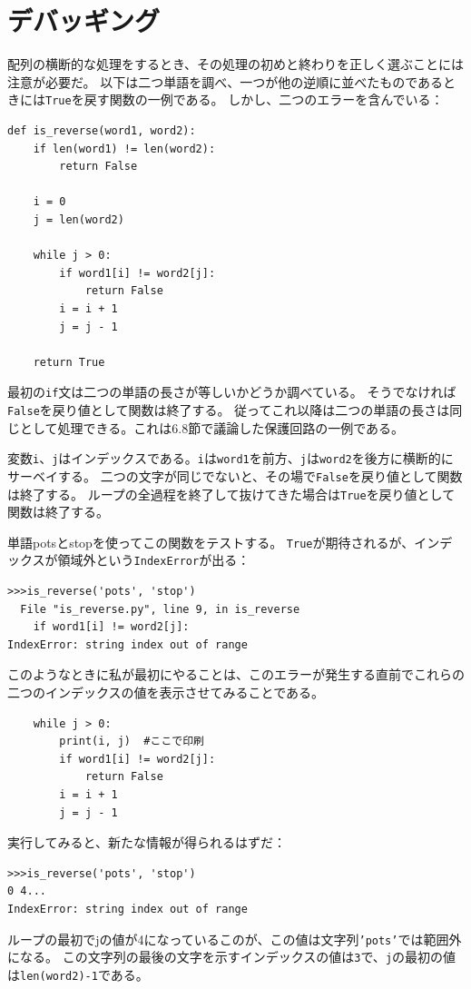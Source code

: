 \documentclass[a4j,12pt,makeidx]{jbook}
\begin{document}
\section{デバッギング}
配列の横断的な処理をするとき、その処理の初めと終わりを正しく選ぶことには注意が必要だ。
以下は二つ単語を調べ、一つが他の逆順に並べたものであるときには{\tt True}を戻す関数の一例である。
しかし、二つのエラーを含んでいる：
\begin{verbatim}
def is_reverse(word1, word2):
    if len(word1) != len(word2):
        return False

    i = 0
    j = len(word2)

    while j > 0:
        if word1[i] != word2[j]:
            return False
        i = i + 1
        j = j - 1

    return True
\end{verbatim}
最初の{\tt if}文は二つの単語の長さが等しいかどうか調べている。
そうでなければ{\tt False}を戻り値として関数は終了する。
従ってこれ以降は二つの単語の長さは同じとして処理できる。これは6.8節で議論した保護回路の一例である。\par
変数{\tt i}、{\tt j}はインデックスである。{\tt i}は{\tt word1}を前方、{\tt j}は{\tt word2}を後方に横断的にサーベイする。
二つの文字が同じでないと、その場で{\tt False}を戻り値として関数は終了する。
ループの全過程を終了して抜けてきた場合は{\tt True}を戻り値として関数は終了する。 \par
単語potsとstopを使ってこの関数をテストする。
{\tt True}が期待されるが、インデックスが領域外という{\tt IndexError}が出る：
\begin{verbatim}
>>>is_reverse('pots', 'stop')
  File "is_reverse.py", line 9, in is_reverse
    if word1[i] != word2[j]:
IndexError: string index out of range
\end{verbatim}
このようなときに私が最初にやることは、このエラーが発生する直前でこれらの二つのインデックスの値を表示させてみることである。
\begin{verbatim}
    while j > 0:
        print(i, j)  #ここで印刷
        if word1[i] != word2[j]:
            return False
        i = i + 1
        j = j - 1
\end{verbatim}
実行してみると、新たな情報が得られるはずだ：
\begin{verbatim}
>>>is_reverse('pots', 'stop')
0 4...
IndexError: string index out of range
\end{verbatim}
ループの最初でjの値が4になっているこのが、この値は文字列{\tt 'pots'}では範囲外になる。
この文字列の最後の文字を示すインデックスの値は{\tt 3}で、{\tt j}の最初の値は{\tt len(word2)-1}である。\par
\end{document}
